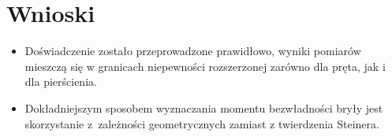 \documentclass[a4paper,11pt]{article}
\begin{document}
\section{Wnioski}
\begin{itemize}
\item Doświadczenie zostało przeprowadzone prawidłowo, wyniki pomiarów mieszczą się w granicach niepewności rozszerzonej zarówno dla pręta, jak i dla pierścienia.
\item Dokładniejszym sposobem wyznaczania momentu bezwładności bryły jest skorzystanie z~zależności geometrycznych zamiast z twierdzenia Steinera.

\end{itemize}
\end{document}
